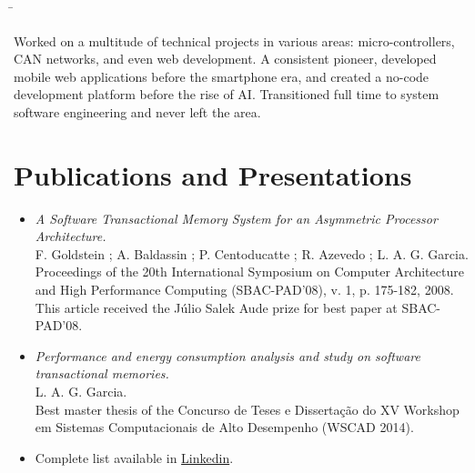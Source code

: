 \documentclass[10pt]{article} %
\begin{document}
\begin{tabbing}

\hspace{\tabwidth} \= \kill

\>

\begin{minipage}{\smallertextwidth}

Worked on a multitude of technical projects in various areas: micro-controllers, CAN networks, and even web development. A consistent pioneer, developed mobile web applications before the smartphone era, and created a no-code development platform before the rise of AI. Transitioned full time to system software engineering and never left the area.

\end{minipage}

\end{tabbing}


\section{Publications and Presentations}

\begin{itemize}
 \item \textit{A Software Transactional Memory System for an Asymmetric Processor Architecture.} \\
 F. Goldstein ; A. Baldassin ; P. Centoducatte ; R. Azevedo ; L. A. G. Garcia. \\
 Proceedings of the 20th International Symposium on Computer Architecture and High Performance Computing (SBAC-PAD'08), v. 1, p. 175-182, 2008. \\
 This article received the Júlio Salek Aude prize for best paper at SBAC-PAD’08.
 \item \textit{Performance and energy consumption analysis and study on software transactional memories.} \\
 L. A. G. Garcia. \\
 Best master thesis of the Concurso de Teses e Dissertação do XV Workshop em Sistemas Computacionais de Alto Desempenho (WSCAD 2014).
 \item Complete list available in \href{https://www.linkedin.com/in/laggarcia/}{Linkedin}.
\end{itemize}
\end{document}
